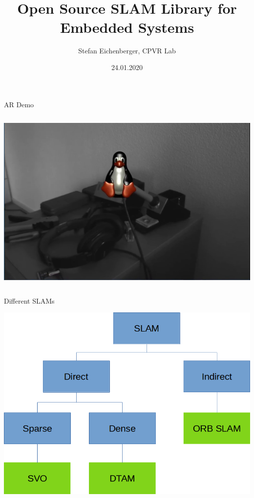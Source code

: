 \documentclass[aspectratio=169,12pt]{beamer}
\begin{document}
\obeylines

\title[Open Source SLAM Library for Embedded Systems]{Open Source SLAM Library for Embedded Systems}
\author{Stefan Eichenberger, CPVR Lab}
\date{24.01.2020}

\begin{frame}
  \titlepage\thispagestyle{empty}
\end{frame}



\begin{frame}{AR Demo}
  \vspace{-6pt}
  \begin{columns}[T]
    \column{\dimexpr\paperwidth}\centering
    \href{run:ar-demo.mp4?autostart&loop}{\includegraphics[height=0.98\textheight]{out/ar-demo.png}}
  \end{columns}
\end{frame}

\begin{frame}{Different SLAMs}
  \begin{center}
    \includegraphics[height=0.9\textheight]{../img/slam_modes.png}
  \end{center}
\end{frame}
\end{document}
